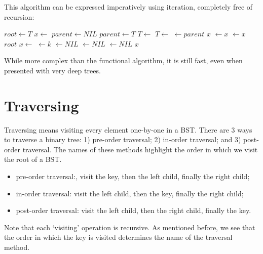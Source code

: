 \documentclass{article}
\begin{document}
This algorithm can be expressed imperatively using iteration, completely free of recursion:

\begin{algorithmic}[1]
  \State $root \gets T$
  \State $x \gets$ 
  \State $parent \gets NIL$
    \State $parent \gets T$
      \State $T \gets $ 
    \Else
      \State $T \gets $ 
    \EndIf
  \EndWhile
  \State {} $\gets parent$
   
    \State \Return $x$
    \State {} $\gets x$
  \Else
    \State {} $\gets x$
  \EndIf
  \State \Return $root$
\EndFunction
\Statex
{}
  \State $x \gets $ 
  \State {} $ \gets k$
  \State {} $ \gets NIL$
  \State {} $ \gets NIL$
  \State {} $ \gets NIL$
  \State \Return $x$
\EndFunction
\end{algorithmic}

While more complex than the functional algorithm, it is still fast, even when presented with very deep trees.

\section{Traversing}

Traversing means visiting every element one-by-one in a BST. There are 3 ways to traverse a binary tree: 1) pre-order traversal; 2) in-order traversal; and 3) post-order traversal. The names of these methods highlight the order in which we visit the root of a BST.

\begin{itemize}
\item pre-order traversal:, visit the key, then the left child, finally the right child;
\item in-order traversal: visit the left child, then the key, finally the right child;
\item post-order traversal: visit the left child, then the right child, finally the key.
\end{itemize}

  

Note that each `visiting' operation is recursive. As mentioned before, we see that the order in which
the key is visited determines the name of the traversal method.
\end{document}
